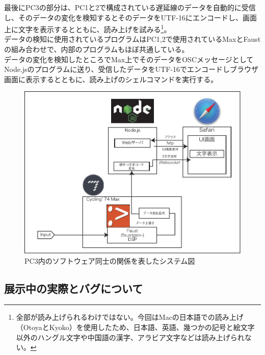 \documentclass[a4paper,report]{jsbook}
\begin{document}
最後にPC3の部分は、PC1と2で構成されている遅延線のデータを自動的に受信し、そのデータの変化を検知するとそのデータをUTF-16にエンコードし、画面上に文字を表示するとともに、読み上げを試みる\footnote{全部が読み上げられるわけではない。今回はMacの日本語での読み上げ（OtoyaとKyoko）を使用したため、日本語、英語、幾つかの記号と絵文字以外のハングル文字や中国語の漢字、アラビア文字などは読み上げられない。}。\\
データの検知に使用されているプログラムはPC1,2で使用されているMaxとFaustの組み合わせで、内部のプログラムもほぼ共通している。\\
データの変化を検知したところでMax上でそのデータをOSCメッセージとしてNode.jsのプログラムに送り、受信したデータをUTF-16でエンコードしブラウザ画面に表示するとともに、読み上げのシェルコマンドを実行する。

\begin{no-prefix-figure-caption}

\begin{figure}[htbp]
\centering
\includegraphics[width=1.00000\textwidth]{./img/qam2speech_diagram.pdf}
\caption{PC3内のソフトウェア同士の関係を表したシステム図}
\end{figure}

\end{no-prefix-figure-caption}

\subsection{展示中の実際とバグについて}\label{ux5c55ux793aux4e2dux306eux5b9fux969bux3068ux30d0ux30b0ux306bux3064ux3044ux3066}
\end{document}
